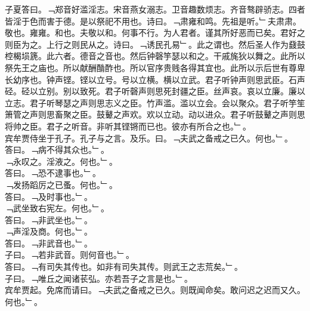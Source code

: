\documentclass{zhvt-classic}
\begin{document}
\hspace*{2em}子夏答曰。﹁郑音好滥淫志。宋音燕女溺志。卫音趣数烦志。齐音骜辟骄志。四者皆淫于色而害于德。是以祭祀不用也。诗曰。﹁肃雍和鸣。先祖是听。﹂夫肃肃。敬也。雍雍。和也。夫敬以和。何事不行。为人君者。谨其所好恶而已矣。君好之则臣为之。上行之则民从之。诗曰。﹁诱民孔易﹂。此之谓也。然后圣人作为鼗鼓椌楬埙篪。此六者。德音之音也。然后钟磬竽瑟以和之。干戚旄狄以舞之。此所以祭先王之庙也。所以献酬酳酢也。所以官序贵贱各得其宜也。此所以示后世有尊卑长幼序也。钟声铿。铿以立号。号以立横。横以立武。君子听钟声则思武臣。石声硁。硁以立别。别以致死。君子听磬声则思死封疆之臣。丝声哀。哀以立廉。廉以立志。君子听琴瑟之声则思志义之臣。竹声滥。滥以立会。会以聚众。君子听竽笙箫管之声则思畜聚之臣。鼓鼙之声欢。欢以立动。动以进众。君子听鼓鼙之声则思将帅之臣。君子之听音。非听其铿锵而已也。彼亦有所合之也。﹂。\\
\hspace*{2em}宾牟贾侍坐于孔子。孔子与之言。及乐。曰。﹁夫武之备戒之已久。何也。﹂。\\
\hspace*{2em}答曰。﹁病不得其众也。﹂。\\
\hspace*{2em}﹁永叹之。淫液之。何也。﹂。\\
\hspace*{2em}答曰。﹁恐不逮事也。﹂。\\
\hspace*{2em}﹁发扬蹈厉之已蚤。何也。﹂。\\
\hspace*{2em}答曰。﹁及时事也。﹂。\\
\hspace*{2em}﹁武坐致右宪左。何也。﹂。\\
\hspace*{2em}答曰。﹁非武坐也。﹂。\\
\hspace*{2em}﹁声淫及商。何也。﹂。\\
\hspace*{2em}答曰。﹁非武音也。﹂。\\
\hspace*{2em}子曰。﹁若非武音。则何音也。﹂。\\
\hspace*{2em}答曰。﹁有司失其传也。如非有司失其传。则武王之志荒矣。﹂。\\
\hspace*{2em}子曰。﹁唯丘之闻诸苌弘。亦若吾子之言是也。﹂。\\
\hspace*{2em}宾牟贾起。免席而请曰。﹁夫武之备戒之已久。则既闻命矣。敢问迟之迟而又久。何也。﹂。\\
\end{document}
